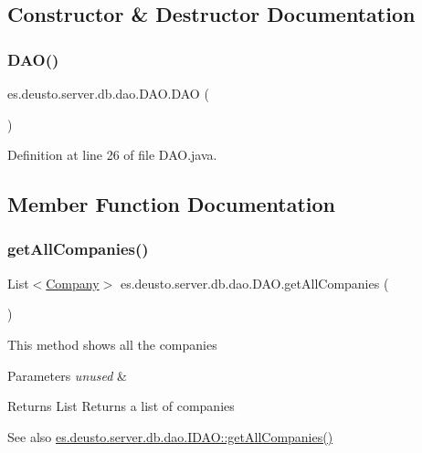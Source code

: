 \subsection{Constructor \& Destructor Documentation}
\mbox{\label{classes_1_1deusto_1_1server_1_1db_1_1dao_1_1_d_a_o_a1f12a4ca454651d41896e45c42db8f90}} 
\subsubsection{\texorpdfstring{D\+A\+O()}{DAO()}}
{\footnotesize\ttfamily es.\+deusto.\+server.\+db.\+dao.\+D\+A\+O.\+D\+AO (\begin{DoxyParamCaption}{ }\end{DoxyParamCaption})}



Definition at line 26 of file D\+A\+O.\+java.



\subsection{Member Function Documentation}
\mbox{\label{classes_1_1deusto_1_1server_1_1db_1_1dao_1_1_d_a_o_ac564970c7e308393497e874655470aaa}} 
\subsubsection{\texorpdfstring{get\+All\+Companies()}{getAllCompanies()}}
{\footnotesize\ttfamily List$<$\hyperlink{classes_1_1deusto_1_1server_1_1db_1_1data_1_1_company}{Company}$>$ es.\+deusto.\+server.\+db.\+dao.\+D\+A\+O.\+get\+All\+Companies (\begin{DoxyParamCaption}{ }\end{DoxyParamCaption})}

This method shows all the companies 
\begin{DoxyParams}{Parameters}
{\em unused} & \\
\hline
\end{DoxyParams}
\begin{DoxyReturn}{Returns}
List Returns a list of companies 
\end{DoxyReturn}
\begin{DoxySeeAlso}{See also}
\hyperlink{interfacees_1_1deusto_1_1server_1_1db_1_1dao_1_1_i_d_a_o_ad83c37658f356cb69c1fa70f99416579}{es.\+deusto.\+server.\+db.\+dao.\+I\+D\+A\+O\+::get\+All\+Companies()} 
\end{DoxySeeAlso}


